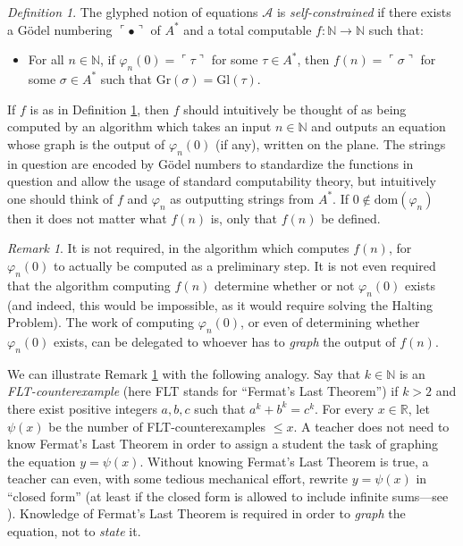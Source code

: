 \documentclass[table, svgnames, dvipsnames, letterpaper, 11pt]{report}
\theoremstyle{remark}
\newtheorem{remark}[theorem]{Remark}
\newtheorem{definition}[theorem]{Definition}
\begin{document}
\begin{definition}
\label{selfconstraintdefn}
  The glyphed notion of equations $\mathcal A$ is \emph{self-constrained}
  if there exists a G\"odel numbering $\ulcorner\bullet\urcorner$
  of $A^*$ and a total computable $f:\mathbb N\to\mathbb N$ such that:
  \begin{itemize}
    \item
    For all $n\in\mathbb N$, if $\varphi_n(0)=\ulcorner\tau\urcorner$
    for some $\tau\in A^*$, then
    $f(n)=\ulcorner\sigma\urcorner$ for some $\sigma\in A^*$
    such that $\mathrm{Gr}(\sigma)=\mathrm{Gl}(\tau)$.
  \end{itemize}
\end{definition}

If $f$ is as in Definition \ref{selfconstraintdefn}, then $f$ should intuitively be
thought of as being computed by an algorithm which takes an input $n\in\mathbb N$
and outputs an equation whose graph is the output of
$\varphi_n(0)$ (if any), written on the plane. The strings in question are
encoded by G\"odel numbers to standardize the functions in question and allow
the usage of standard computability theory, but intuitively one should think of
$f$ and $\varphi_n$ as outputting strings from $A^*$.
If $0\not\in\mathrm{dom}(\varphi_n)$ then it does not matter what $f(n)$ is,
only that $f(n)$ be defined.

\begin{remark}
\label{importantremark}
It is not required, in the algorithm which
computes $f(n)$, for $\varphi_n(0)$ to actually be computed as a preliminary
step. It is not even required that the algorithm computing $f(n)$ determine
whether or not $\varphi_n(0)$ exists (and indeed, this would be impossible,
as it would require solving the Halting Problem). The work of computing
$\varphi_n(0)$, or even of determining whether $\varphi_n(0)$ exists, can
be delegated to whoever has to \emph{graph} the output of $f(n)$.
\end{remark}

We can illustrate Remark \ref{importantremark} with the
following analogy. Say that $k\in\mathbb N$ is an \emph{FLT-counterexample}
(here FLT stands for ``Fermat's Last Theorem'')
if $k>2$ and there exist positive integers $a,b,c$ such that $a^k+b^k=c^k$.
For every $x\in\mathbb R$, let $\psi(x)$ be the number of FLT-counterexamples
$\leq x$. A teacher does not need to know Fermat's Last Theorem in order to
assign a student the task of graphing the equation $y=\psi(x)$.
Without knowing Fermat's Last Theorem is true, a teacher can even, with
some tedious mechanical effort, rewrite $y=\psi(x)$ in ``closed form''
(at least if the closed form is allowed to include infinite sums---see
\cite{alexander2006formulas}). Knowledge of Fermat's Last Theorem is
required in order to \emph{graph} the equation, not to \emph{state} it.
\end{document}
